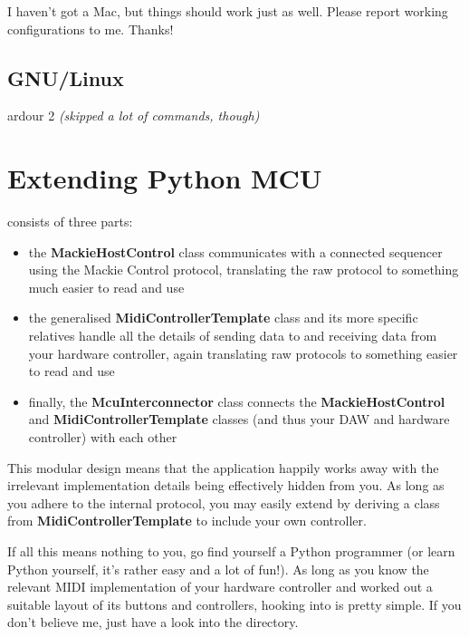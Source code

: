 I haven't got a Mac, but things should work just as well.  Please
report working configurations to me.  Thanks!

\section{GNU/Linux}

\begin{compactitem}
\item ardour 2 \emph{(skipped a lot of commands, though)}
\end{compactitem}

\chapter{Extending Python MCU}
\label{chap:extending_python_mcu}

 consists of three parts:

\begin{itemize}

\item the \textbf{MackieHostControl} class communicates with a
  connected sequencer using the Mackie Control protocol, translating
  the raw protocol to something much easier to read and use

\item the generalised \textbf{MidiControllerTemplate} class and its
  more specific relatives handle all the details of sending data to
  and receiving data from your hardware controller, again translating
  raw protocols to something easier to read and use

\item finally, the \textbf{McuInterconnector} class connects the
  \textbf{MackieHostControl} and \textbf{MidiControllerTemplate}
  classes (and thus your DAW and hardware controller) with each other

\end{itemize}

This modular design means that the application happily works away with
the irrelevant implementation details being effectively hidden from
you.  As long as you adhere to the internal protocol, you may easily
extend  by deriving a class from
\textbf{MidiControllerTemplate} to include your own controller.

If all this means nothing to you, go find yourself a Python programmer
(or learn Python yourself, it's rather easy and a lot of fun!).  As
long as you know the relevant MIDI implementation of your hardware
controller and worked out a suitable layout of its buttons and
controllers, hooking into  is pretty simple.
If you don't believe me, just have a look into the 
directory.






